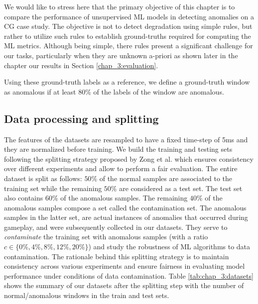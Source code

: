 We would like to stress here that the primary objective of this chapter is to compare the performance of unsupervised ML models in detecting anomalies on a CG case study. The objective is not to detect degradation using simple rules, but rather to utilize such rules to establish ground-truths required for computing the ML metrics. Although being simple, there rules present a significant challenge for our tasks, particularly when they are unknown a-priori as shown later in the chapter our results in Section \ref{chap_3:evaluation}.

Using these ground-truth labels as a reference, we define a ground-truth window as anomalous if at least $80\%$ of the labels of the window are anomalous.

\subsection{Data processing and splitting}
The features of the datasets are resampled to have a fixed time-step of 5ms and they are normalized before training.
We build the training and testing sets following the splitting strategy proposed by Zong et al. \cite{zong2018deep} which ensures consistency over different experiments and allow to perform a fair evaluation. The entire dataset is split as follows: $50\%$ of the normal samples are associated to the training set while the remaining $50\%$ are considered as a test set. The test set also contains $60\%$ of the anomalous samples. The remaining $40\%$ of the anomalous samples compose a set called the contamination set. The anomalous samples in the latter set, are actual instances of anomalies that occurred during gameplay, and were subsequently collected in our datasets. They serve to \textit{contaminate} the training set with anomalous samples (with a ratio $c\in\{0\%,4\%,8\%,12\%,20\%\}$) and study the robustness of ML algorithms to data contamination. The rationale behind this splitting strategy is to maintain consistency across various experiments and ensure fairness in evaluating model performance under conditions of data contamination.
 Table \ref{tab:chap_3:datasets} shows the summary of our datasets after the splitting step with the number of normal/anomalous windows in the train and test sets.
 
